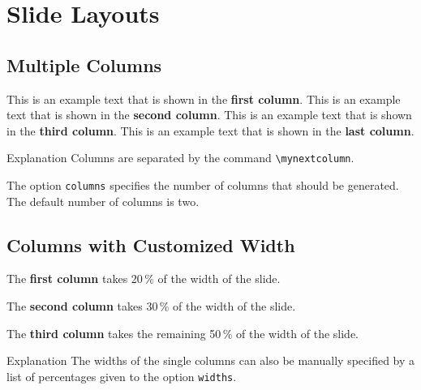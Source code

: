 \documentclass[
	aspectratio=169, %
	8pt, %
]{beamer}
\begin{document}
{\section{Slide Layouts}

\subsection{Multiple Columns}
\begin{frame}{\insertsubsection}
	\begin{mycolumns}[columns=4] %
		This is an example text that is shown in the \textbf{first column}.
	\mynextcolumn
		This is an example text that is shown in the \textbf{second column}.
	\mynextcolumn
		This is an example text that is shown in the \textbf{third column}.
	\mynextcolumn
		This is an example text that is shown in the \textbf{last column}.
	\end{mycolumns}
	\vfill
	\begin{note}{Explanation}
		Columns are separated by the command \texttt{\textbackslash mynextcolumn}.

		The option \texttt{columns} specifies the number of columns that should be generated. The default number of columns is two.
	\end{note}
\end{frame}

\subsection{Columns with Customized Width}
\begin{frame}{\insertsubsection}
	\begin{mycolumns}[columns=3,widths={20,30}]
		\begin{example}{}
			The \textbf{first column} takes 20\,\% of the width of the slide.
		\end{example}
	\mynextcolumn
		\begin{example}{}
			The \textbf{second column} takes 30\,\% of the width of the slide.
		\end{example}
	\mynextcolumn
		\begin{example}{}
			The \textbf{third column} takes the remaining 50\,\% of the width of the slide.
		\end{example}
	\end{mycolumns}
	\vfill
	\begin{note}{Explanation}
		The widths of the single columns can also be manually specified by a list of percentages given to the option \texttt{widths}.


\end{note}
\end{frame}}
\end{document}
